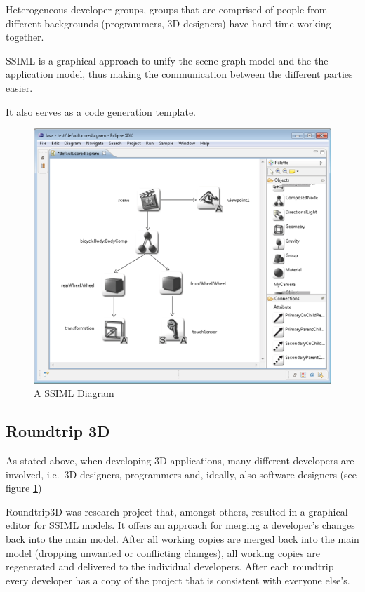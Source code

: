 Heterogeneous developer groups, groups that are comprised of people from
different backgrounds (programmers, 3D designers) have hard time working
together. \cite{Glinz:2015:SUS:2802768.2802838}

SSIML is a graphical approach to unify the scene-graph model and the the
application model, thus making the communication between the different
parties easier.

It also serves as a code generation template.

\begin{figure}[htbp]
  \centering
  \includegraphics[width=12cm]{../assets/SSIML.png}
	\caption{A SSIML Diagram \cite{roundtrip3dwebsite}}
	\label{fig:ssimldiagram}
\end{figure}

\subsection{Roundtrip 3D}\label{roundtrip-3d}

As stated above, when developing 3D applications, many different
developers are involved, i.e.~3D designers, programmers and, ideally,
also software designers (see figure \ref{fig:ssimldiagram})


Roundtrip3D was research project that, amongst others, resulted in a
graphical editor for \hyperref[ssiml]{SSIML} models. It offers an
approach for merging a developer's changes back into the main model.
After all working copies are merged back into the main model (dropping
unwanted or conflicting changes), all working copies are regenerated and
delivered to the individual developers. After each roundtrip every
developer has a copy of the project that is consistent with everyone
else's.

